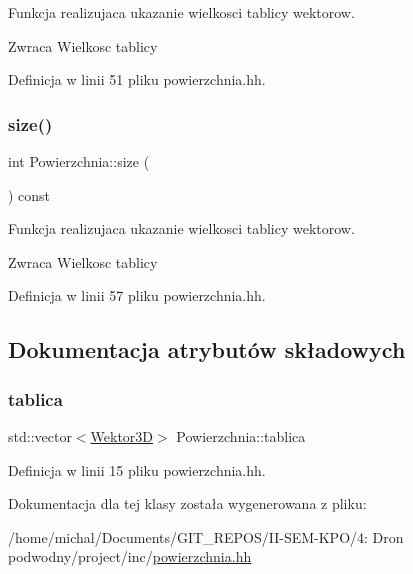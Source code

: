 Funkcja realizujaca ukazanie wielkosci tablicy wektorow. 

\begin{DoxyReturn}{Zwraca}
Wielkosc tablicy 
\end{DoxyReturn}


Definicja w linii 51 pliku powierzchnia.\+hh.

\mbox{\label{class_powierzchnia_a27dc891c3c0dd476c6c3b51389a85d08}} 
\subsubsection{\texorpdfstring{size()}{size()}\hspace{0.1cm}{\footnotesize\ttfamily [2/2]}}
{\footnotesize\ttfamily int Powierzchnia\+::size (\begin{DoxyParamCaption}{ }\end{DoxyParamCaption}) const\hspace{0.3cm}{\ttfamily [inline]}}



Funkcja realizujaca ukazanie wielkosci tablicy wektorow. 

\begin{DoxyReturn}{Zwraca}
Wielkosc tablicy 
\end{DoxyReturn}


Definicja w linii 57 pliku powierzchnia.\+hh.



\subsection{Dokumentacja atrybutów składowych}
\mbox{\label{class_powierzchnia_ad4f42cfe700565a02dc07ead950d4c53}} 
\subsubsection{\texorpdfstring{tablica}{tablica}}
{\footnotesize\ttfamily std\+::vector$<$\hyperlink{class_wektor3_d}{Wektor3D}$>$ Powierzchnia\+::tablica}



Definicja w linii 15 pliku powierzchnia.\+hh.



Dokumentacja dla tej klasy została wygenerowana z pliku\+:\begin{DoxyCompactItemize}
\item 
/home/michal/\+Documents/\+G\+I\+T\+\_\+\+R\+E\+P\+O\+S/\+I\+I-\/\+S\+E\+M-\/\+K\+P\+O/4\+: Dron podwodny/project/inc/\hyperlink{powierzchnia_8hh}{powierzchnia.\+hh}\end{DoxyCompactItemize}
